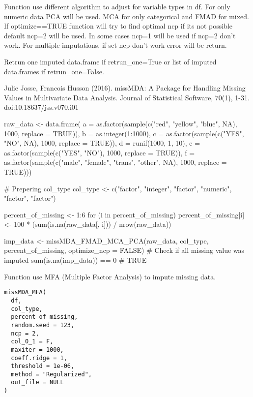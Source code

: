 \documentclass[letterpaper]{book}
\begin{document}
%
\begin{Details}\relax
Function use different algorithm to adjust for variable types in df. For only numeric data PCA will be used. MCA for only categorical and FMAD for mixed. If optimize==TRUE function will try to find optimal ncp if its not possible default ncp=2 will be used. In some cases ncp=1 will be used if ncp=2 don't work. For multiple imputations, if set ncp don't work error will be return.
\end{Details}
%
\begin{Value}
Retrun one imputed data.frame if retrun\_one=True or list of imputed data.frames if retrun\_one=False.
\end{Value}
%
\begin{References}\relax
Julie Josse, Francois Husson (2016). missMDA: A Package for Handling Missing Values in Multivariate Data Analysis. Journal of Statistical Software, 70(1), 1-31. doi:10.18637/jss.v070.i01
\end{References}
%
\begin{Examples}
\begin{ExampleCode}
{
  raw_data <- data.frame(
    a = as.factor(sample(c("red", "yellow", "blue", NA), 1000, replace = TRUE)),
    b = as.integer(1:1000),
    c = as.factor(sample(c("YES", "NO", NA), 1000, replace = TRUE)),
    d = runif(1000, 1, 10),
    e = as.factor(sample(c("YES", "NO"), 1000, replace = TRUE)),
    f = as.factor(sample(c("male", "female", "trans", "other", NA), 1000, replace = TRUE)))

  # Prepering col_type
  col_type <- c("factor", "integer", "factor", "numeric", "factor", "factor")

  percent_of_missing <- 1:6
  for (i in percent_of_missing) {
    percent_of_missing[i] <- 100 * (sum(is.na(raw_data[, i])) / nrow(raw_data))
  }


  imp_data <- missMDA_FMAD_MCA_PCA(raw_data, col_type, percent_of_missing, optimize_ncp = FALSE)
  # Check if all missing value was imputed
  sum(is.na(imp_data)) == 0
  # TRUE
}
\end{ExampleCode}
\end{Examples}
%
\begin{Description}\relax
Function use MFA (Multiple Factor Analysis) to impute missing data.
\end{Description}
%
\begin{Usage}
\begin{verbatim}
missMDA_MFA(
  df,
  col_type,
  percent_of_missing,
  random.seed = 123,
  ncp = 2,
  col_0_1 = F,
  maxiter = 1000,
  coeff.ridge = 1,
  threshold = 1e-06,
  method = "Regularized",
  out_file = NULL
)
\end{verbatim}
\end{Usage}
\end{document}
